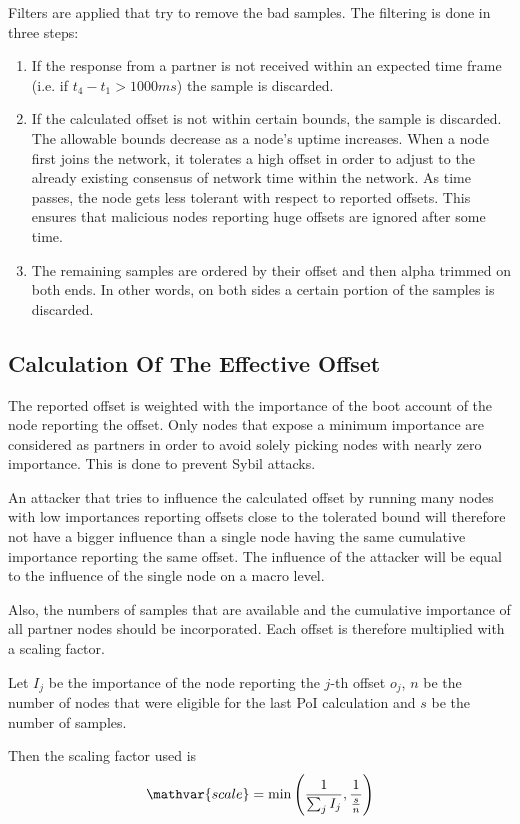 Filters are applied that try to remove the bad samples. The filtering is done in three steps:
\begin{enumerate}
\item If the response from a partner is not received within an expected time frame (i.e. if $t_4-t_1 > 1000ms$) the sample is discarded.
\item If the calculated offset is not within certain bounds, the sample is discarded.
The allowable bounds decrease as a node's uptime increases.
When a node first joins the network, it tolerates a high offset in order to adjust to the already existing consensus of network time within the network.
As time passes, the node gets less tolerant with respect to reported offsets.
This ensures that malicious nodes reporting huge offsets are ignored after some time.
\item The remaining samples are ordered by their offset and then alpha trimmed on both ends.
In other words, on both sides a certain portion of the samples is discarded.
\end{enumerate}

\subsection{Calculation Of The Effective Offset}

The reported offset is weighted with the importance of the boot account of the node reporting the offset.
Only nodes that expose a minimum importance are considered as partners in order to avoid solely picking nodes with nearly zero importance.
This is done to prevent Sybil attacks.

An attacker that tries to influence the calculated offset by running many nodes with low importances reporting offsets close to the tolerated bound will therefore not have a bigger influence than a single node having the same cumulative importance reporting the same offset.
The influence of the attacker will be equal to the influence of the single node on a macro level.

Also, the numbers of samples that are available and the cumulative importance of all partner nodes should be incorporated.
Each offset is therefore multiplied with a scaling factor.

Let $I_j$ be the importance of the node reporting the $j$-th offset $o_j$,
$n$ be the number of nodes that were eligible for the last PoI calculation and $s$ be the number of samples.

Then the scaling factor used is
$$ \mathvar{scale} = \min\left(\frac{1}{\sum_j I_j}, \frac{1}{\frac{s}{n}}\right)$$

